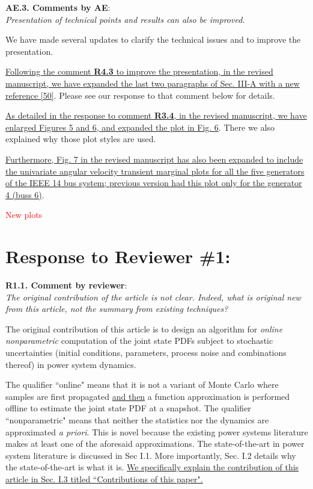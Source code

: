 \documentclass[12pt,onecolumn]{IEEEtran}
\newcommand{\blue}{\color{blue}}
\newcommand{\red}{\textcolor{red}}
\def\spacingset#1{\def\baselinestretch{#1}\small\normalsize}
\newcommand{\nib}{\noindent  {\bf Response:} }
\begin{document}
\noindent
{\bf AE.3. Comments by AE}:\\
{\em Presentation of technical points and results can also be improved.}

{\nib {\blue We have made several updates to clarify the technical issues and to improve the presentation.

\ul{Following the comment \textbf{R4.3} to improve the presentation, in the revised manuscript, we have expanded the last two paragraphs of Sec. III-A with a new reference [50]}. Please see our response to that comment below for details. 

\ul{As detailed in the response to comment \textbf{R3.4}, in the revised manuscript, we have enlarged Figures 5 and 6, and expanded the plot in Fig. 6}. There we also explained why those plot styles are used.

\ul{Furthermore, Fig. 7 in the revised manuscript has also been expanded to include the univariate angular velocity transient marginal plots for all the five generators of the IEEE 14 bus system; previous version had this plot only for the generator 4 (buss 6)}.

{\red{New plots}}
}}





\newpage
\spacingset{1}

\section*{\large \bf Response to Reviewer \#1:}


\noindent
{\bf R1.1. Comment by reviewer}:\\
{\em The original contribution of the article is not clear.  Indeed, what is original new from this article, not the summary from existing techniques?}


{\nib {\blue The original contribution of this article is to design an algorithm for \emph{online nonparametric} computation of the joint state PDFs subject to stochastic uncertainties (initial conditions, parameters, process noise and combinations thereof) in power system dynamics. 

The qualifier ``online" means that it is not a variant of Monte Carlo where samples are first propagated \ul{and then} a function approximation is performed offline to estimate the joint state PDF at a snapshot. The qualifier ``nonparametric" means that neither the statistics nor the dynamics are approximated \emph{a priori}. This is novel because the existing power systems literature makes at least one of the aforesaid approximations. The state-of-the-art in power system literature is discussed in Sec I.1. More importantly, Sec. I.2 details why the state-of-the-art is what it is. \ul{We specifically explain the contribution of this article in Sec. I.3 titled ``Contributions of this paper".}
}}
\end{document}
